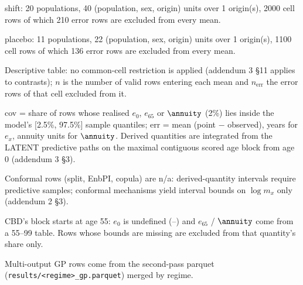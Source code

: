 {\begin{minipage}{\linewidth}
\noindent shift: 20 populations, 40 (population, sex, origin) units over 1 origin(s), 2000 cell rows of which 210 error rows are excluded from every mean.\par
\noindent placebo: 11 populations, 22 (population, sex, origin) units over 1 origin(s), 1100 cell rows of which 136 error rows are excluded from every mean.\par
\noindent Descriptive table: no common-cell restriction is applied (addendum 3 \S11 applies to contrasts); $n$ is the number of valid rows entering each mean and $n_{\mathrm{err}}$ the error rows of that cell excluded from it.\par
\noindent cov = share of rows whose realised $e_0$, $e_{65}$ or $\annuity$ (2\%) lies inside the model's [2.5\%, 97.5\%] sample quantiles; err = mean (point $-$ observed), years for $e_x$, annuity units for $\annuity$. Derived quantities are integrated from the LATENT predictive paths on the maximal contiguous scored age block from age 0 (addendum 3 \S3).\par
\noindent Conformal rows (split, EnbPI, copula) are n/a: derived-quantity intervals require predictive samples; conformal mechanisms yield interval bounds on $\log m_x$ only (addendum 2 \S3).\par
\noindent CBD's block starts at age 55: $e_0$ is undefined (--) and $e_{65}$ / $\annuity$ come from a 55--99 table. Rows whose bounds are missing are excluded from that quantity's share only.\par
\noindent Multi-output GP rows come from the second-pass parquet (\texttt{results/<regime>\_gp.parquet}) merged by regime.\par
\end{minipage}}
